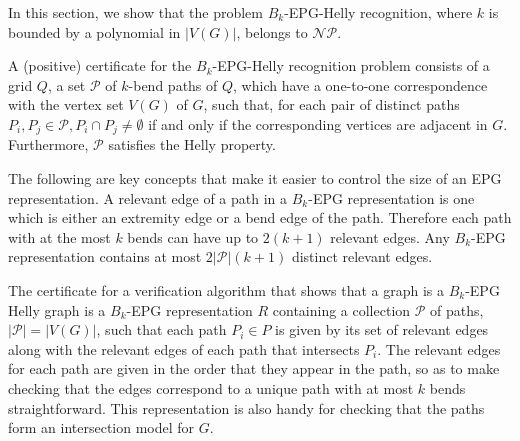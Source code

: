 \documentclass[runningheads]{llncs}
\begin{document}
In this section, we show that the problem $B_k$-EPG-Helly recognition, where $k$ is bounded by a polynomial in $|V(G)|$, belongs to $\mathcal{NP}$. 


A (positive) certificate for the {\sc $B_k$-EPG-Helly recognition} problem consists of a grid $Q$, a set $\mathcal{P}$ of $k$-bend paths of $Q$, which have a one-to-one correspondence with the vertex set $V(G)$ of $G$, such that, for each pair of distinct paths $P_i, P_j\in \mathcal{P}, P_i\cap P_j \neq \emptyset $ if and only if the corresponding vertices are adjacent in $G$. Furthermore, $\mathcal{P}$ satisfies the Helly property.




The following are key concepts that make it easier to control the size of an EPG representation. A relevant edge of a path in a $B_k$-EPG representation is one which is either an extremity edge or a bend edge of the path. Therefore each path with at the most $k$ bends can have up to $2(k + 1)$ relevant edges. Any $B_k$-EPG representation contains at most $2|\mathcal{P}|(k + 1)$ distinct relevant edges. 

The certificate for a verification algorithm  that shows that a graph is a $B_k$-EPG Helly graph is a  $B_k$-EPG representation $R$ containing a collection $\mathcal{P}$ of paths, $|\mathcal{P}| = |V(G)|$, such that  each path $P_i \in P$ is given by its set of relevant edges along with the relevant edges of each path that intersects $P_i$.  The relevant edges for each path are given in the order that they appear in the path, so as to make checking that the edges correspond to a unique path with at most $k$ bends straightforward.  This representation is also handy for checking that the paths form an intersection model for $G$.
\end{document}
